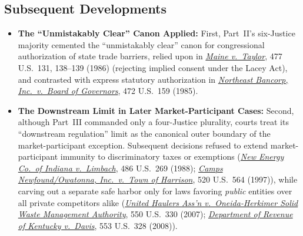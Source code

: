 \documentclass[12pt]{article}
\begin{document}
\subsection{Subsequent Developments}

\begin{itemize}

\item \textbf{The ``Unmistakably Clear'' Canon Applied:} First, Part~II's six-Justice majority cemented the ``unmistakably clear'' canon for congressional authorization of state trade barriers, relied upon in \href{https://supreme.justia.com/cases/federal/us/477/131/}{\textit{Maine v.\ Taylor}}, 477 U.S.\ 131, 138--139 (1986) (rejecting implied consent under the Lacey Act), and contrasted with express statutory authorization in \href{https://supreme.justia.com/cases/federal/us/472/159/}{\textit{Northeast Bancorp, Inc.\ v.\ Board of Governors}}, 472 U.S.\ 159 (1985).

\item \textbf{The Downstream Limit in Later Market-Participant Cases:} Second, although Part~III commanded only a four-Justice plurality, courts treat its ``downstream regulation'' limit as the canonical outer boundary of the market-participant exception. Subsequent decisions refused to extend market-participant immunity to discriminatory taxes or exemptions (\href{https://supreme.justia.com/cases/federal/us/486/269/}{\textit{New Energy Co.\ of Indiana v.\ Limbach}}, 486 U.S.\ 269 (1988); \href{https://supreme.justia.com/cases/federal/us/520/564/}{\textit{Camps Newfound/Owatonna, Inc.\ v.\ Town of Harrison}}, 520 U.S.\ 564 (1997)), while carving out a separate safe harbor only for laws favoring \emph{public} entities over all private competitors alike (\href{https://supreme.justia.com/cases/federal/us/550/330/}{\textit{United Haulers Ass'n v.\ Oneida-Herkimer Solid Waste Management Authority}}, 550 U.S.\ 330 (2007); \href{https://supreme.justia.com/cases/federal/us/553/328/}{\textit{Department of Revenue of Kentucky v.\ Davis}}, 553 U.S.\ 328 (2008)).

\end{itemize}
\end{document}
